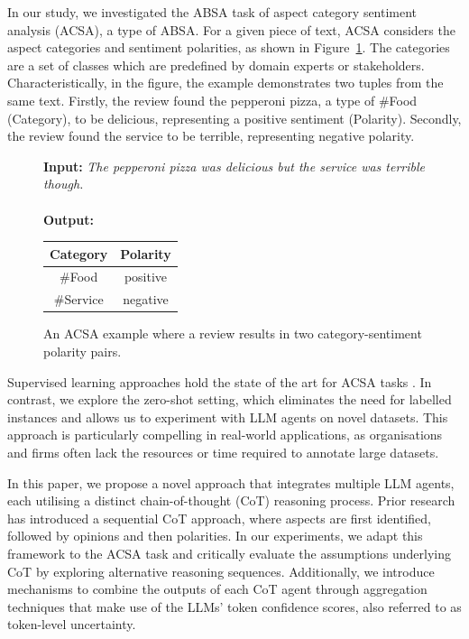 \documentclass[11pt]{article}
\begin{document}
In our study, we investigated the ABSA task of aspect category sentiment analysis (ACSA), a type of ABSA. For a given piece of text, ACSA considers the aspect categories and sentiment polarities, as shown in Figure~\ref{fig:quad_example}. The categories are a set of classes which are predefined by domain experts or stakeholders. Characteristically, in the figure, the example demonstrates two tuples from the same text. Firstly, the review found the pepperoni pizza, a type of \#Food (Category), to be delicious, representing a positive sentiment (Polarity). Secondly, the review found the service to be terrible, representing negative polarity.

\begin{figure}[h]
    \centering

\begin{tcolorbox}[colframe=black, colback=gray!10, width=2.6in, title=ACSA Tuple Example]
\textbf{Input:} \textit{The pepperoni pizza was delicious but the service was terrible though.}
\\~\\
\textbf{Output:}
\begin{minipage}[t]{0.55\linewidth}
  \centering
  \vspace{-\baselineskip} %
  \begin{tabular}{|c|c|}
    \hline
    \textbf{Category} & \textbf{Polarity} \\
    \hline
    \#Food & positive \\
    \hline
    \#Service & negative \\
    \hline
  \end{tabular}
\end{minipage}
\end{tcolorbox}

    \caption{An ACSA example where a review results in two category-sentiment polarity pairs.}
    \label{fig:quad_example}
\end{figure}

Supervised learning approaches hold the state of the art for ACSA tasks \citep{cai-etal-2020-aspect,PING2024126994,Xu2025}. In contrast, we explore the zero-shot setting, which eliminates the need for labelled instances and allows us to experiment with LLM agents on novel datasets. This approach is particularly compelling in real-world applications, as organisations and firms often lack the resources or time required to annotate large datasets.

In this paper, we propose a novel approach that integrates multiple LLM agents, each utilising a distinct chain-of-thought (CoT) reasoning process. Prior research \citep{fei-etal-2023-reasoning,10499502} has introduced a sequential CoT approach, where aspects are first identified, followed by opinions and then polarities. In our experiments, we adapt this framework to the ACSA task and critically evaluate the assumptions underlying CoT by exploring alternative reasoning sequences. Additionally, we introduce mechanisms to combine the outputs of each CoT agent through aggregation techniques that make use of the LLMs' token confidence scores, also referred to as token-level uncertainty.
\end{document}
